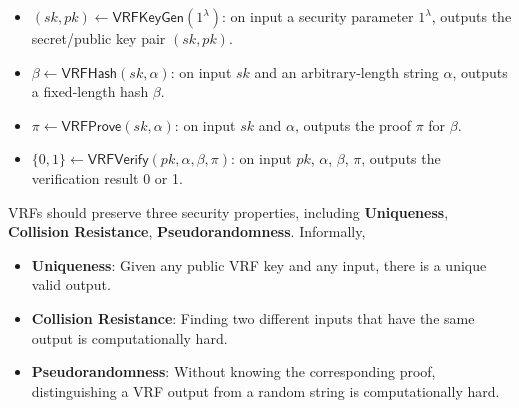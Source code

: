 \begin{itemize}
    \item $(sk, pk) \gets \mathsf{VRFKeyGen}(1^{\lambda})$: on input a security parameter $1^{\lambda}$, outputs the secret/public key pair $(sk, pk)$.
    \item $\beta \gets \mathsf{VRFHash}(sk, \alpha)$: on input $sk$ and an arbitrary-length string $\alpha$, outputs a fixed-length hash $\beta$.
    \item $\pi \gets \mathsf{VRFProve}(sk, \alpha)$: on input $sk$ and $\alpha$, outputs the proof $\pi$ for $\beta$.
    \item $\{0, 1\} \gets \mathsf{VRFVerify}(pk, \alpha, \beta, \pi)$: on input $pk$, $\alpha$, $\beta$, $\pi$, outputs the verification result 0 or 1.
\end{itemize}

VRFs should preserve three security properties, including \textbf{Uniqueness}, \textbf{Collision Resistance}, \textbf{Pseudorandomness}. Informally, 

\begin{itemize}
    \item \textbf{Uniqueness}: Given any public VRF key and any input, there is a unique valid output.
    \item \textbf{Collision Resistance}: Finding two different inputs that have the same output is computationally hard.
    \item \textbf{Pseudorandomness}: Without knowing the corresponding proof, distinguishing a VRF output from a random string is computationally hard.
\end{itemize}

